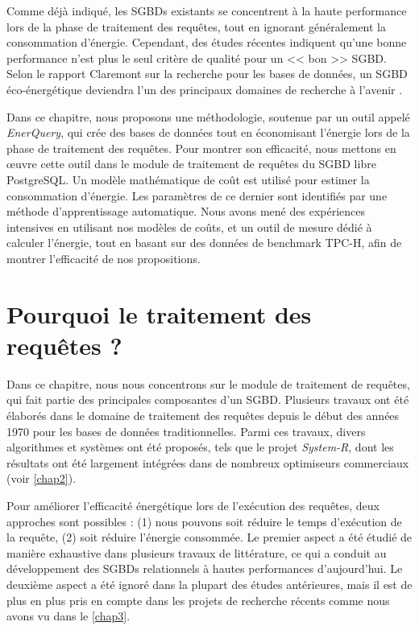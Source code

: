 Comme déjà indiqué, les SGBDs existants se concentrent à la haute performance lors de la phase de traitement des requêtes, tout en ignorant généralement la consommation d'énergie. Cependant, des études récentes indiquent qu'une bonne performance n'est plus le seul critère de qualité pour un << bon >> SGBD. Selon le rapport Claremont sur la recherche pour les bases de données, un SGBD éco-énergétique deviendra l'un des principaux domaines de recherche à l'avenir \cite{Claremont08,Abadi16}.

Dans ce chapitre, nous proposons une méthodologie, soutenue par un outil appelé \textit{EnerQuery}, qui crée des bases de données tout en économisant l'énergie lors de la phase de traitement des requêtes. Pour montrer son efficacité, nous mettons en œuvre cette outil dans le module de traitement de requêtes du SGBD libre PostgreSQL. Un modèle mathématique de coût est utilisé pour estimer la consommation d'énergie. Les paramètres de ce dernier sont identifiés par une méthode d'apprentissage automatique. Nous avons mené des expériences intensives en utilisant nos modèles de coûts, et un outil de mesure dédié à calculer l'énergie, tout en basant sur des données de benchmark TPC-H, afin de montrer l’efficacité de nos propositions.

\section{Pourquoi le traitement des requêtes ?}\label{PourquoiOptimisationLogique}
Dans ce chapitre, nous nous concentrons sur le module de traitement de requêtes, qui fait partie des principales composantes d'un SGBD. Plusieurs travaux ont été élaborés dans le domaine de traitement des requêtes depuis le début des années 1970 pour les bases de données traditionnelles. Parmi ces travaux, divers algorithmes et systèmes ont été proposés, tels que le projet \textit{System-R}, dont les résultats ont été largement intégrées dans de nombreux optimiseurs commerciaux (voir \ref{chap2}).

Pour améliorer l'efficacité énergétique lors de l'exécution des requêtes, deux approches sont possibles : (1) nous pouvons soit réduire le temps d'exécution de la requête, (2) soit réduire l'énergie consommée. Le premier aspect a été étudié de manière exhaustive dans plusieurs travaux de littérature, ce qui a conduit au développement des SGBDs relationnels à hautes performances d'aujourd'hui. Le deuxième aspect a été ignoré dans la plupart des études antérieures, mais il est de plus en plus pris en compte dans les projets de recherche récents comme nous avons vu dans le \ref{chap3}.

